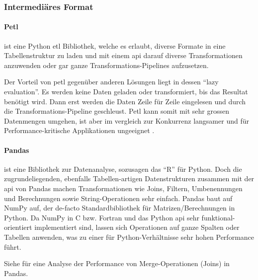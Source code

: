 \subsubsection{Intermediäres Format}
\paragraph{Petl} 
ist eine Python \acs{etl} Bibliothek, welche es erlaubt, diverse Formate in eine Tabellenstruktur zu laden und mit einem \acs{api} darauf diverse Transformationen anzuwenden oder gar ganze Transformations-Pipelines aufzusetzen.

Der Vorteil von petl gegenüber anderen Lösungen liegt in dessen ``lazy evaluation''. Es werden keine Daten geladen oder transformiert, bis das Resultat benötigt wird. Dann erst werden die Daten Zeile für Zeile eingelesen und durch die Transformations-Pipeline geschleust. Petl kann somit mit sehr grossen Datenmengen umgehen, ist aber im vergleich zur Konkurrenz langsamer und für Performance-kritische Applikationen ungeeignet \cite[Intro $\to$ Design goals]{petl}.

\paragraph{Pandas} ist eine Bibliothek zur Datenanalyse, sozusagen das ``R'' für Python. Doch die zugrundeliegenden, ebenfalls Tabellen-artigen Datenstrukturen zusammen mit der \acs{api} von Pandas machen Transformationen wie Joins, Filtern, Umbenennungen und Berechnungen sowie String-Operationen sehr einfach. Pandas baut auf NumPy auf, der de-facto Standardbibliothek für Matrizen/Berechnungen in Python. Da NumPy in C bzw. Fortran und das Python \acs{api} sehr funktional-orientiert implementiert sind, lassen sich Operationen auf ganze Spalten oder Tabellen anwenden, was zu einer für Python-Verhältnisse sehr hohen Performance führt.

Siehe \cite{pandasMergePerformance} für eine Analyse der Performance von Merge-Operationen (Joins) in Pandas.

